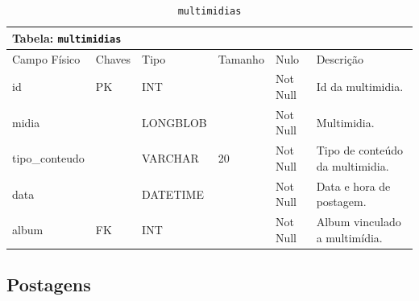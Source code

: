 \documentclass[12pt,a4paper]{article}
\begin{document}
\begin{center}
\begin{table}[h!]
	\caption{\texttt{multimidias}}
	\label{tabela:multimidias}
	\begin{tabular}{|p{2.3cm}|p{1.2cm}|p{1.8cm}|p{1.5cm}|p{1cm}|p{6cm}|}\hline		
		\multicolumn{6}{|p{16cm}|}{\cellcolor{cinzaClaro}  \centering Tabela: \texttt{multimidias}} \\ \hline %
		{\small Campo Físico}   & {\small Chaves} & {\small Tipo} & {\small Tamanho} & {\small Nulo} & {\small Descrição}\\\hline %
		
		{\tiny id} & {\tiny PK} & {\tiny INT} & {\tiny } & {\tiny Not Null} &{\tiny Id da multimidia.}\\\hline
		{\tiny midia} & {\tiny } & {\tiny LONGBLOB} & {\tiny } & {\tiny Not Null} &{\tiny Multimidia. }\\\hline
		{\tiny tipo\_conteudo} & {\tiny } & {\tiny VARCHAR} & {\tiny 20} & {\tiny Not Null} &{\tiny Tipo de conteúdo da multimidia.}\\\hline
		{\tiny data} & {\tiny } & {\tiny DATETIME} & {\tiny } & {\tiny Not Null} &{\tiny Data e hora de postagem.}\\\hline
		{\tiny album} & {\tiny FK} & {\tiny INT} & {\tiny } & {\tiny Not Null} &{\tiny Album vinculado a multimídia. }\\\hline
			
	\end{tabular}
\end{table}	
\end{center}

\subsection{Postagens}

\end{document}
